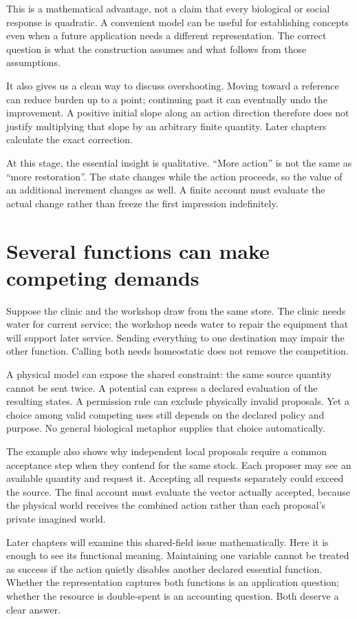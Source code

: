 This is a mathematical advantage, not a claim that every biological or social response is quadratic. A convenient model can be useful for establishing concepts even when a future application needs a different representation. The correct question is what the construction assumes and what follows from those assumptions.

It also gives us a clean way to discuss overshooting. Moving toward a reference can reduce burden up to a point; continuing past it can eventually undo the improvement. A positive initial slope along an action direction therefore does not justify multiplying that slope by an arbitrary finite quantity. Later chapters calculate the exact correction.

At this stage, the essential insight is qualitative. ``More action'' is not the same as ``more restoration''. The state changes while the action proceeds, so the value of an additional increment changes as well. A finite account must evaluate the actual change rather than freeze the first impression indefinitely.

\section{Several functions can make competing demands}
Suppose the clinic and the workshop draw from the same store. The clinic needs water for current service; the workshop needs water to repair the equipment that will support later service. Sending everything to one destination may impair the other function. Calling both needs homeostatic does not remove the competition.

A physical model can expose the shared constraint: the same source quantity cannot be sent twice. A potential can express a declared evaluation of the resulting states. A permission rule can exclude physically invalid proposals. Yet a choice among valid competing uses still depends on the declared policy and purpose. No general biological metaphor supplies that choice automatically.

The example also shows why independent local proposals require a common acceptance step when they contend for the same stock. Each proposer may see an available quantity and request it. Accepting all requests separately could exceed the source. The final account must evaluate the vector actually accepted, because the physical world receives the combined action rather than each proposal's private imagined world.

Later chapters will examine this shared-field issue mathematically. Here it is enough to see its functional meaning. Maintaining one variable cannot be treated as success if the action quietly disables another declared essential function. Whether the representation captures both functions is an application question; whether the resource is double-spent is an accounting question. Both deserve a clear answer.

